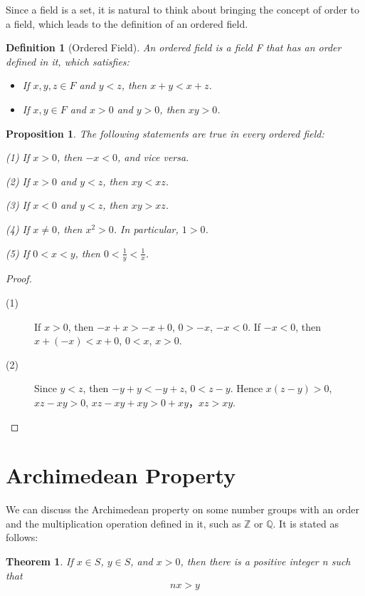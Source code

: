 \documentclass{article}
\newtheorem{definition}{Definition}[section]
\newtheorem{theorem}{Theorem}[section]
\newtheorem{proposition}{Proposition}[section]
\begin{document}
Since a field is a set, it is natural to think about bringing the concept of 
order to a field, which leads to the definition of an ordered field.

\begin{definition}[Ordered Field]
  An ordered field is a field F that has an order defined in it, which satisfies:
  \begin{itemize}
    \item If $x, y, z \in F$ and $y < z$, then $x + y < x + z$.
    \item If $x, y \in F$ and $x > 0$ and $y > 0$, then $xy > 0$.
  \end{itemize}
\end{definition}

\begin{proposition}
  The following statements are true in every ordered field:
  \begin{description}
    \item{(1)} If $x > 0$, then $-x < 0$, and vice versa.
    \item{(2)} If $x > 0$ and $y < z$, then $xy < xz$.
    \item{(3)} If $x < 0$ and $y < z$, then $xy > xz$.
    \item{(4)} If $x \neq 0$, then $x^2 > 0$. In particular, $1 > 0$.
    \item{(5)} If $0 < x < y$, then $0 < \frac{1}{y} < \frac{1}{x}$.
  \end{description}
\end{proposition}
\begin{proof}
  \begin{description}
    \item[(1)] If $x > 0$, then $-x + x > -x + 0$, $ 0 > -x$, $-x < 0$. 
    If $-x < 0$, then $x + (-x) < x + 0$, $0 < x$, $x > 0$.
    \item[(2)] Since $y < z$, then $-y + y < -y + z$, $0 < z - y$. Hence 
    $x(z - y) > 0$, $xz - xy > 0$, $xz - xy + xy > 0 + xy$，$xz > xy$.
  \end{description}  
\end{proof}

\section{Archimedean Property}
We can discuss the Archimedean property on some number groups with an order and 
the multiplication operation defined in it, such as $\mathbb{Z}$ or $\mathbb{Q}$.
It is stated as follows:
\begin{theorem}
  If $x \in S$, $y \in S$, and $x > 0$, then there is a positive integer n such 
  that
  \[
    nx > y
  \]
\end{theorem}
\end{document}

